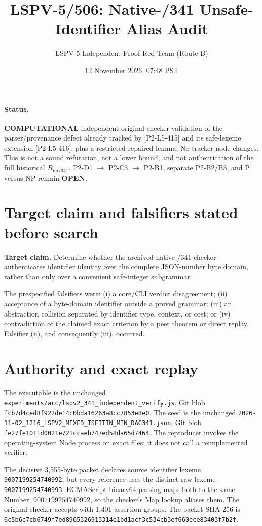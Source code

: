 \documentclass[11pt]{article}
\title{LSPV-5/506: Native-/341 Unsafe-Identifier Alias Audit}
\author{LSPV-5 Independent Proof Red Team (Route B)}
\date{12 November 2026, 07:48 PST}
\begin{document}
\maketitle

\paragraph{Status.} \textbf{COMPUTATIONAL} independent original-checker validation of the parser/provenance defect already tracked by [P2-L5-415] and its safe-lexeme extension [P2-L5-416], plus a restricted repaired lemma.  No tracker node changes.  This is not a sound refutation, not a lower bound, and not authentication of the full historical $R_{\mathrm{mix341}}$.  P2-D1 $\to$ P2-C3 $\to$ P2-B1, separate P2-B2/B3, and P versus NP remain \textbf{OPEN}.

\section{Target claim and falsifiers stated before search}
\textbf{Target claim.}  Determine whether the archived native-/341 checker authenticates identifier identity over the complete JSON-number byte domain, rather than only over a convenient safe-integer subgrammar.

The prespecified falsifiers were: (i) a core/CLI verdict disagreement; (ii) acceptance of a byte-domain identifier outside a proved grammar; (iii) an abstraction collision separated by identifier type, context, or cost; or (iv) contradiction of the claimed exact criterion by a peer theorem or direct replay.  Falsifier (ii), and consequently (iii), occurred.

\section{Authority and exact replay}
The executable is the unchanged \texttt{experiments/arc/lspv2\_341\_independent\_verify.js}, Git blob
\texttt{fcb7d4ced8f922de14c0bda16263a8cc7853e8e0}.  The seed is the unchanged
\texttt{2026-11-02\_1216\_LSPV2\_MIXED\_TSEITIN\_MIN\_DAG341.json}, Git blob
\texttt{fe27fe1011d0021e721ccaeb747ed58da65d7464}.  The reproducer invokes the operating-system Node process on exact files; it does not call a reimplemented verifier.

The decisive 3,555-byte packet declares source identifier lexeme
\texttt{9007199254740992}, but every reference uses the distinct raw lexeme
\texttt{9007199254740993}.  ECMAScript binary64 parsing maps both to the same Number, $9007199254740992$, so the checker's Map lookup aliases them.  The original checker accepts with 1,401 assertion groups.  The packet SHA-256 is
\texttt{6c5b6c7cb6749f7ed8965326913314e1bd1acf3c534cb3ef660ece83403f7b2f}.
\end{document}
